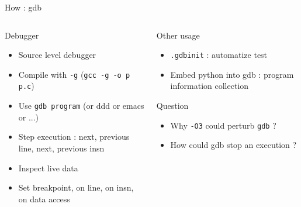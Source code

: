 %
\begin{Frame}{How : gdb}
  \begin{columns}[t]
    \begin{column}{\BW} %
      \begin{block}{Debugger}
        \begin{itemize}
        \item Source level debugger
        \item Compile with \texttt{-g} (\texttt{gcc -g -o p p.c})
        \item Use \texttt{gdb program} (or ddd or emacs or ...)
        \item Step execution : next, previous line, next, previous insn
        \item Inspect live data
        \item Set breakpoint, on line, on insn, on data access
        \end{itemize}
      \end{block} 
    \end{column}
    
    \begin{column}{\BW} %
      \begin{block}{Other usage}
        \begin{itemize}
        \item \texttt{.gdbinit} : automatize test
        \item Embed python into gdb : program information collection
        \end{itemize}
      \end{block}   
      \begin{alertblock}{Question}
        \begin{itemize}
        \item Why \texttt{-O3} could perturb \texttt{gdb} ?
        \item How could gdb stop an execution ?
        \end{itemize}
      \end{alertblock}
    \end{column}
  \end{columns}  
\end{Frame}


